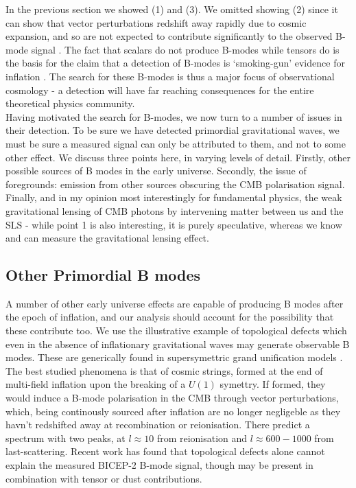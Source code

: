 \documentclass[a4paper,10pt]{article}
\begin{document}
In the previous section we showed (1) and (3). We omitted showing (2) since it can show that vector perturbations redshift away rapidly due to cosmic expansion, and so are not expected to contribute significantly to the observed B-mode signal  \cite{vector}. The fact that scalars do not produce B-modes while tensors do is the basis for the claim that a detection of B-modes is `smoking-gun'  evidence for inflation \cite{smokinggun}. The search for these B-modes is thus a major focus of observational cosmology - a detection will have far reaching consequences for the entire theoretical physics community. \\

Having motivated the search for B-modes, we now turn to a number of issues in their detection. To be sure we have detected primordial gravitational waves, we must be sure a measured signal can only be attributed to them, and not to some other effect. We discuss three points here, in varying levels of detail. Firstly, other possible sources of B modes in the early universe. Secondly, the issue of foregrounds: emission from other sources obscuring the CMB polarisation signal. Finally, and in my opinion most interestingly for fundamental physics, the weak gravitational lensing of CMB photons by intervening matter between us and the SLS - while point 1 is also interesting, it is purely speculative, whereas we know and can measure the gravitational lensing effect.


\subsection{Other Primordial B modes}

A number of other early universe effects are capable of producing B modes after the epoch of inflation, and our analysis should account for the possibility that these contribute too. We use the illustrative example of topological defects which even in the absence of inflationary gravitational waves may generate observable B modes. These are generically found in supersymettric grand unification models \cite{CMBPol}.\\

The best studied phenomena is that of cosmic strings, formed at the end of multi-field inflation upon the breaking of a $U(1)$ symettry. If formed, they would induce a B-mode polarisation in the CMB through vector perturbations, which, being continously sourced after inflation are no longer negligeble as they havn't redshifted away at recombination or reionisation. There predict a spectrum with two peaks, at $l\approx10$ from reionisation and $l\approx 600-1000$ from last-scattering. Recent work has found that topological defects alone cannot explain the measured BICEP-2 B-mode signal, though may be present in combination with tensor or dust contributions.\\
\end{document}
